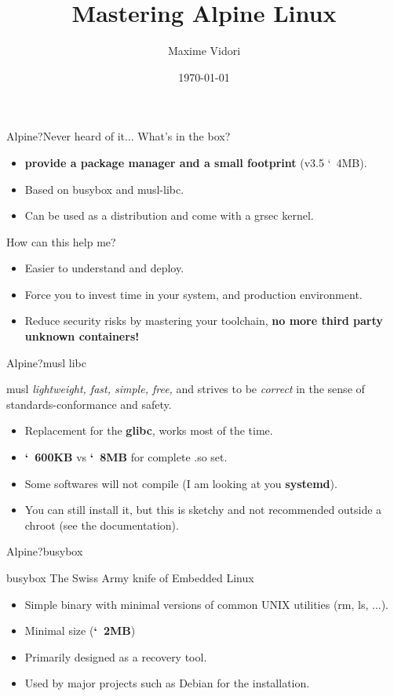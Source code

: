 \documentclass[aspectratio=169]{beamer}
\title{Mastering Alpine Linux}
\date{\today}
\author{Maxime Vidori}
\begin{document}
\begin{frame}
  \titlepage
\end{frame}


\begin{frame}{Alpine?}{Never heard of it...}
  What's in the box?
  \begin{itemize}
    \item \textbf{provide a package manager and a small footprint} (v3.5 \char`~4MB).
    \item Based on busybox and musl-libc.
    \item Can be used as a distribution and come with a grsec kernel.
  \end{itemize}
  How can this help me?
  \begin{itemize}
    \item Easier to understand and deploy.
    \item Force you to invest time in your system, and production
      environment.
    \item Reduce security risks by mastering your toolchain,
      \textbf{no more third party unknown containers!}
  \end{itemize}
\end{frame}

\begin{frame}{Alpine?}{musl libc}
  \begin{block}{musl}
    \textit{lightweight, fast, simple, free,} and strives to be
    \textit{correct} in the sense of standards-conformance and safety.
    \end{block}
  \begin{itemize}
    \item Replacement for the \textbf{glibc}, works most of the time.
    \item \textbf{\char`~600KB} vs \textbf{\char`~8MB} for complete .so set.
    \item Some softwares will not compile (I am looking at you \textbf{systemd}).
  \item You can still install it, but this is sketchy and not
      recommended outside a chroot (see the documentation).
  \end{itemize}
\end{frame}

\begin{frame}{Alpine?}{busybox}
  \begin{block}{busybox}
    The Swiss Army knife of Embedded Linux
  \end{block}
  \begin{itemize}
    \item Simple binary with minimal versions of common UNIX utilities
      (rm, ls, ...).
    \item Minimal size (\textbf{\char`~2MB})
    \item Primarily designed as a recovery tool.
    \item Used by major projects such as Debian for the installation.
  \end{itemize}
\end{frame}
\end{document}
